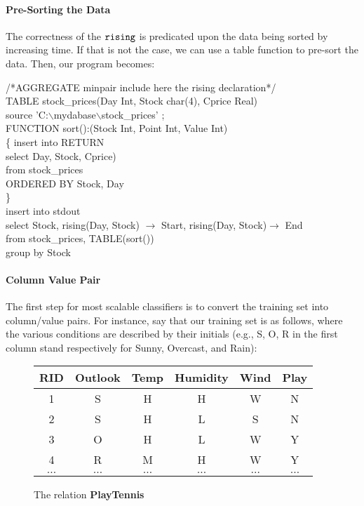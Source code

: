 \paragraph{Pre-Sorting the Data}
The correctness of the $\tt rising$ is predicated upon the data
being sorted by increasing time. If that is not the case, we can
use a table function to pre-sort the data. Then, our program
becomes:
\begin{codedisplay}
\> /*{AGGREGATE} minpair  include here the rising declaration*/\\
\> TABLE stock\_prices(Day Int, Stock char(4), Cprice Real)\\
\>\>\>\>\>\>\>\>\>\>\>source  'C:$\backslash$mydabase$\backslash$stock\_prices' ;\\[0.1cm]
\>FUNCTION sort():(Stock Int, Point Int, Value Int)\\
\>\> \{ \> insert into RETURN\\
\>\>\>select Day, Stock, Cprice)\\
\>\>\>\>from stock\_prices\\
\>\>\>\> ORDERED BY Stock, Day\\
\> \>\> \} \\[0.1cm]
\>\>insert into stdout\\
\>\>select Stock, rising(Day, Stock) $\rightarrow$ Start,
rising(Day, Stock)$\rightarrow$ End\\
\>\>from stock\_prices, TABLE(sort())\\
\>\>group by Stock\\
\end{codedisplay}


\paragraph{Column Value Pair}The first step for most scalable classifiers
is to convert the training set into column/value pairs. For instance,
say that our training set is as follows, where the  various conditions
are described by their initials (e.g., S, O, R in the first column stand
respectively for Sunny, Overcast, and Rain):

\begin{figure}[htb]
\begin{center}
{\footnotesize
\begin{tabular}{|c|c|c|c|c|c|} \hline
{\bf RID}&{\bf Outlook}&{\bf Temp}&{\bf Humidity}&{\bf Wind}&{\bf Play}\\
\hline
1&S&H&H&W&N\\
2&S&H&L&S&N\\
3&O&H&L&W&Y\\
4&R&M&H&W&Y\\
$\ldots$& $\ldots$& $\ldots$ & $\ldots$ & $\ldots$& $\ldots$\\
\end{tabular}
}
\caption{The relation \bf PlayTennis} \label{tab:tennis}
\end{center}
\end{figure}

